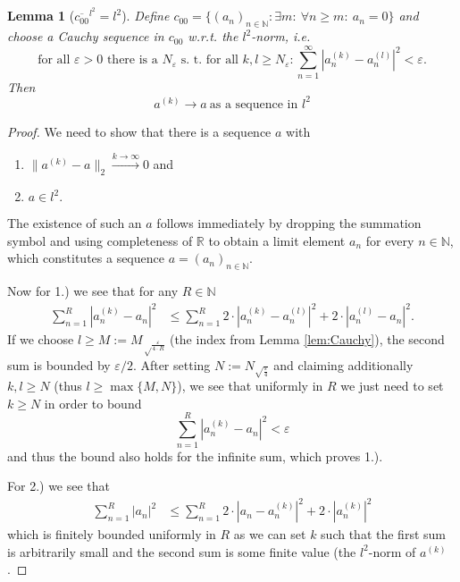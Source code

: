 \documentclass{scrartcl}
\newtheorem{lemma}{Lemma}
\theoremstyle{definition}
\theoremstyle{remark}
\newcommand{\eps}{\varepsilon}
\newcommand{\N}{\mathbb N}
\newcommand{\R}{\mathbb R}
\begin{document}
\begin{lemma}[$\overline{c_{00}}^{l^2} = l^2$]\label{lem:c00l2}
Define $c_{00} = \{(a_n)_{n\in\N}: \exists m:~ \forall n\geq m:~ a_n = 0\}$ and choose a Cauchy sequence in $c_{00}$ w.r.t. the $l^2$-norm, i.e.
\[\text{for all } \eps > 0 \text{ there is a } N_\eps \text{ s. t. for all } k,l\geq N_\eps: \sum_{n=1}^\infty |a_n^{(k)} - a_n^{(l)}|^2 < \eps.\]
Then \[a^{(k)} \to a ~ \text{as a sequence in $l^2$}\]
\end{lemma}
\begin{proof}
We need to show that there is a sequence $a$ with
\begin{enumerate}
\item $\|a^{(k)} - a\|_2 \xrightarrow{k\to\infty} 0$ and
\item $a \in l^2.$
\end{enumerate}
The existence of such an $a$ follows immediately by dropping the summation symbol and using completeness of $\R$ to obtain a limit element $a_n$ for every $n\in \N$, which constitutes a sequence $a = (a_n)_{n\in\N}$.

Now for 1.) we see that for any $R\in\N$
\begin{align*}
\sum_{n=1}^R |a_n^{(k)}-a_n|^2 &\leq  \sum_{n=1}^R 2\cdot |a_n^{(k)}-a_n^{(l)}|^2 + 2\cdot |a_n^{(l)}-a_n|^2.
\end{align*}
If we choose $l \geq M := M_{\sqrt\frac{\eps}{4\cdot R}}$ (the index from Lemma \ref{lem:Cauchy}), the second sum is bounded by $\eps/2$. After setting $N := N_{\sqrt{\frac{\eps}{4}}}$ and claiming additionally $k,l\geq N$ (thus $l\geq\max\{M,N\}$), we see that uniformly in $R$ we just need to set $k \geq N$ in order to bound 
\[\sum_{n=1}^R |a_n^{(k)}-a_n|^2  < \eps \]
and thus the bound also holds for the infinite sum, which proves 1.).

For 2.) we see that 
\begin{align*}
\sum_{n=1}^R |a_n|^2 &\leq \sum_{n=1}^R 2 \cdot|a_n-a_n^{(k)}|^2 + 2\cdot | a_n^{(k)}|^2
\end{align*}
which is finitely bounded uniformly in $R$ as we can set $k$ such that the first sum is arbitrarily small and the second sum is some finite value (the $l^2$-norm of $a^{(k)}$.
\end{proof}
\end{document}
